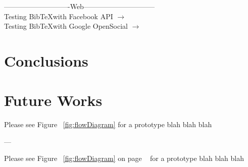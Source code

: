 \documentclass[a4paper]{memoir}
\begin{document}
----------------------------Web------------------------------\\
Testing Bib\TeX with Facebook API $\rightarrow$ \cite{Facebook}\\
Testing Bib\TeX with Google OpenSocial $\rightarrow$ \cite{Google}\\


\section{Conclusions}




\section{Future Works}
Please see Figure ~\ref{fig:flowDiagram} for a prototype blah blah blah

---


Please see Figure ~\ref{fig:flowDiagram} on page ~\pageref{fig:flowDiagram} for a prototype blah blah blah
\end{document}
